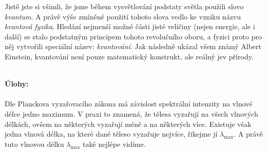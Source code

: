 \documentclass{../../../../style/mkimain}
\begin{document}
Jistě jste si všimli, že jsme během vysvětlování podstaty světla použili slovo \textit{kvantum}.
A právě výše zmíněné použití tohoto slova vedlo ke vzniku názvu \textit{kvantová fyzika}.
Hledání nejmenší možné části jisté veličiny (nejen energie, ale i další) se stalo podstatným principem tohoto revolučního oboru,
a fyzici proto pro něj vytvořili speciální název: \textit{kvantování}.
Jak následně ukázal všem známý Albert Einstein, kvantování není pouze matematický konstrukt, ale reálný jev přírody.
\\
\\
\begin{center}
\end{center}
\textbf{Úlohy:}
\\
\\
Dle Planckova vyzařovacího zákona má závislost spektrální intenzity na vlnové délce jedno maximum.
V praxi to znamená, že tělesa vyzařují na všech vlnových délkách, ovšem na některých vyzařují méně a na některých více.
Existuje však jedna vlnová délka, na které dané těleso vyzařuje nejvíce, říkejme jí $\lambda_\mathrm{max}$.
A právě tuto vlnovou délku $\lambda_\mathrm{max}$ také nejlépe vidíme.
\end{document}
